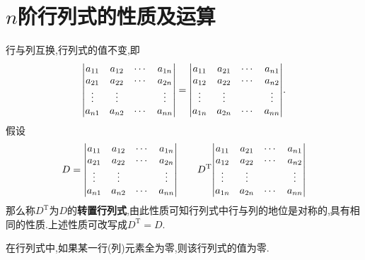 \documentclass[9pt,a4paper]{book}
\begin{document}
\section{$ n $阶行列式的性质及运算}
\begin{feature}
	行与列互换,行列式的值不变,即 \[ {\begin{vmatrix}
		{{a_{11}}}&{{a_{12}}}& \cdots &{{a_{1n}}}\\
		{{a_{21}}}&{{a_{22}}}& \cdots &{{a_{2n}}}\\
		\vdots & \vdots &{\rm{ }}& \vdots \\
		{{a_{n1}}}&{{a_{n2}}}& \cdots &{{a_{nn}}}
		\end{vmatrix}}  =  {\begin{vmatrix}
		{{a_{11}}}&{{a_{21}}}& \cdots &{{a_{n1}}}\\
		{{a_{12}}}&{{a_{22}}}& \cdots &{{a_{n2}}}\\
		\vdots & \vdots &{\rm{ }}& \vdots \\
		{{a_{1n}}}&{{a_{2n}}}& \cdots &{{a_{nn}}}
		\end{vmatrix}} .\]假设\[ D={\begin{vmatrix}
		{{a_{11}}}&{{a_{12}}}& \cdots &{{a_{1n}}}\\
		{{a_{21}}}&{{a_{22}}}& \cdots &{{a_{2n}}}\\
		\vdots & \vdots &{\rm{ }}& \vdots \\
		{{a_{n1}}}&{{a_{n2}}}& \cdots &{{a_{nn}}}
		\end{vmatrix}} \qquad  D^{\mathrm{T}}{\begin{vmatrix}
		{{a_{11}}}&{{a_{21}}}& \cdots &{{a_{n1}}}\\
		{{a_{12}}}&{{a_{22}}}& \cdots &{{a_{n2}}}\\
		\vdots & \vdots &{\rm{ }}& \vdots \\
		{{a_{1n}}}&{{a_{2n}}}& \cdots &{{a_{nn}}}
		\end{vmatrix}} \]那么称$ D^{\mathrm{T}} $为$ D $的\textbf{转置行列式},由此性质可知行列式中行与列的地位是对称的,具有相同的性质.上述性质可改写成$ D^{\mathrm{T}}=D $.
\end{feature}
\begin{feature}
	在行列式中,如果某一行(列)元素全为零,则该行列式的值为零.
\end{feature}
\end{document}
